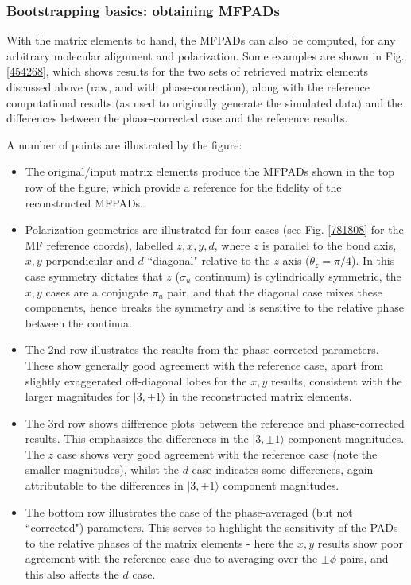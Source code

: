 \documentclass[10pt]{article}
\begin{document}


\subsubsection{Bootstrapping basics: obtaining MFPADs\label{sec:bootstrap-MFPADs}}

With the matrix elements to hand, the MFPADs can also be computed, for any arbitrary molecular alignment and polarization. Some examples are shown in Fig. \ref{454268}, which shows results for the two sets of retrieved matrix elements discussed above (raw, and with phase-correction), along with the reference computational results (as used to originally generate the simulated data) and the differences between the phase-corrected case and the reference results.

A number of points are illustrated by the figure:

\begin{itemize}
\item The original/input matrix elements produce the MFPADs shown in the top row of the figure, which provide a reference for the fidelity of the reconstructed MFPADs. 
\item Polarization geometries are illustrated for four cases (see Fig. \ref{781808} for the MF reference coords), labelled $z,x,y,d$, where $z$ is parallel to the bond axis, $x,y$ perpendicular and $d$ ``diagonal" relative to the $z$-axis ($\theta_{z}=\pi/4$). In this case symmetry dictates that $z$ ($\sigma_u$ continuum) is cylindrically symmetric, the $x,y$ cases are a conjugate $\pi_u$ pair, and that the diagonal case mixes these components, hence breaks the symmetry and is sensitive to the relative phase between the continua.
\item The 2nd row illustrates the results from the phase-corrected parameters. These show generally good agreement with the reference case, apart from slightly exaggerated off-diagonal lobes for the $x,y$ results, consistent with the larger magnitudes for $|3,\pm1\rangle$ in the reconstructed matrix elements.
\item The 3rd row shows difference plots between the reference and phase-corrected results. This emphasizes the differences in the $|3,\pm1\rangle$ component magnitudes. The $z$ case shows very good agreement with the reference case (note the smaller magnitudes), whilst the $d$ case indicates some differences, again attributable to the differences in $|3,\pm1\rangle$ component magnitudes.
\item The bottom row illustrates the case of the phase-averaged (but not ``corrected") parameters. This serves to highlight the sensitivity of the PADs to the relative phases of the matrix elements - here the $x,y$ results show poor agreement with the reference case due to averaging over the $\pm\phi$ pairs, and this also affects the $d$ case.
\end{itemize}
\end{document}
